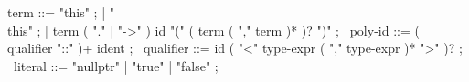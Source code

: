 \begin{syntax}
term ::= "this" ;
  | "\\this" ;
  | term ( "." | "->" ) id "(" ( term ( "," term )* )? ")" ;
\
poly-id ::= ( qualifier "::" )+ ident ;
\
qualifier ::= id ( "<" type-expr ( "," type-expr )* ">" )? ;
\
literal ::= "nullptr" | "true" | "false" ;
\end{syntax}
